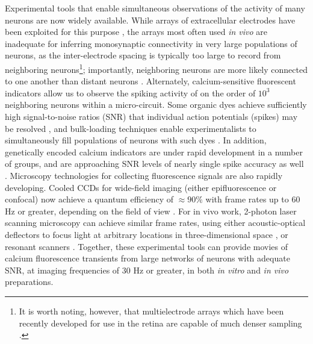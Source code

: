 \documentclass[aoas,preprint]{imsart}
\begin{document}
Experimental tools that enable simultaneous observations of the
activity of many neurons are now widely available. While arrays of
extracellular electrodes have been exploited for this purpose
\cite{HATS98,HARR03,Stein04,Santhanam06,Harris07}, the arrays most
often used \emph{in vivo} are inadequate for inferring monosynaptic
connectivity in very large populations of neurons, as the
inter-electrode spacing is typically too large to record from
neighboring neurons\footnote{It is worth noting, however, that
multielectrode arrays which have been recently developed for use in
the retina are capable of much denser sampling
\cite{Berry2004,Litke2004,Petrusca07,PILL07}.}; importantly,
neighboring neurons are more likely connected to one another than
distant neurons \cite{Abeles91,Braitenberg1998}.  Alternately,
calcium-sensitive fluorescent indicators allow us to observe the
spiking activity of on the order of $10^3$ neighboring neurons
\cite{Tsien89,ImagingManual,CAR03,OHKI05} within a micro-circuit.
Some organic dyes achieve sufficiently high signal-to-noise ratios
(SNR) that individual action potentials (spikes) may be resolved
\cite{ImagingManual}, and bulk-loading techniques enable
experimentalists to simultaneously fill populations of neurons with
such dyes \cite{StosiekKonnerth03}. In addition, genetically encoded
calcium indicators are under rapid development in a number of groups,
and are approaching SNR levels of nearly single spike accuracy as well
\cite{WallaceHasan08}. Microscopy technologies for collecting
fluorescence signals are also rapidly developing. Cooled CCDs for
wide-field imaging (either epifluorescence or confocal) now achieve a
quantum efficiency of $\approx 90 \%$ with frame rates up to $60$ Hz
or greater, depending on the field of view \cite{Djurisic04}. For in
vivo work, 2-photon laser scanning microscopy can achieve similar
frame rates, using either acoustic-optical deflectors to focus light
at arbitrary locations in three-dimensional space
\cite{Iyer06,SalomeBourdieu06,ReddySaggau08}, or resonant scanners
\cite{NguyenParker01}. Together, these experimental tools can provide
movies of calcium fluorescence transients from large networks of
neurons with adequate SNR, at imaging frequencies of $30$ Hz or
greater, in both \emph{in vitro} and \emph{in vivo} preparations.
\end{document}
